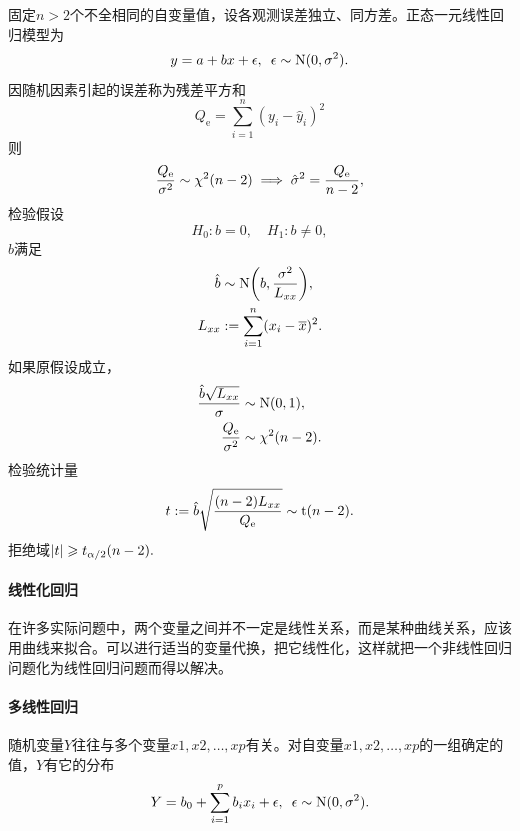 固定$n > 2$个不全相同的自变量值，设各观测误差独立、同方差。正态一元线性回归模型为
\begin{equation}\label{eq:ps-simple-linear-regression}
	y = a + bx + \epsilon,\enspace\epsilon \sim \operatorname{N}(0,\sigma^2).
\end{equation}
因随机因素引起的误差称为残差平方和
\begin{equation}\label{eq:ps-residual-sum-squares}
	Q_{\mathrm e} = \sum_{i=1}^n(y_i - \hat y_i)^2
\end{equation}
则
\begin{equation}\label{eq:ps-regression-error-variance}
	\frac{Q_{\mathrm e}}{\sigma^2} \sim \chi^2(n - 2) \implies \hat\sigma^2 = \frac{Q_{\mathrm e}}{n - 2},
\end{equation}
检验假设 
\[
	H_0:b = 0,\quad H_1:b \neq 0,
\]
$\hat b$满足 
\begin{equation}\label{eq:ps-slope-distribution}
    \begin{aligned}
		\hat b &\sim \operatorname{N}\biggl(b,\frac{\sigma^2}{L_{xx}}\biggr),\\
		L_{xx} &:= \sum_{i=1}^n(x_i - \overline{x})^2.
    \end{aligned}
\end{equation}
如果原假设成立，
\begin{align*}
	\frac{\hat b\sqrt{L_{xx}}}{\sigma} &\sim \operatorname{N}(0,1),\\
	\frac{Q_{\mathrm e}}{\sigma^2} &\sim \chi^2(n - 2).
\end{align*}
检验统计量 
\begin{equation}
	t := \hat b\sqrt{\frac{(n - 2)L_{xx}}{Q_{\mathrm e}}} \sim \operatorname{t}(n - 2).
\end{equation}
拒绝域$\lvert t\rvert \geqslant t_{\alpha/2}(n - 2).$
\paragraph{线性化回归}
在许多实际问题中，两个变量之间并不一定是线性关系，而是某种曲线关系，应该用曲线来拟合。可以进行适当的变量代换，把它线性化，这样就把一个非线性回归问题化为线性回归问题而得以解决。
\paragraph{多线性回归}
随机变量$ Y $往往与多个变量$ x1, x2, \ldots , xp $有关。对自变量$ x1, x2, \ldots, xp $的一组确定的值，$Y $有它的分布
\begin{equation}\label{eq:ps-multiple-linear-regression}
	Y = b_0 + \sum_{i=1}^pb_ix_i + \epsilon,\enspace\epsilon \sim \operatorname{N}(0,\sigma^2).
\end{equation}
